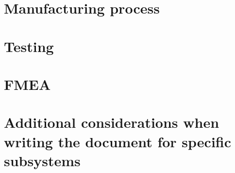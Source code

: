 \section{Manufacturing process}

\section{Testing}

\section{FMEA}

\section{Additional considerations when writing the document for specific subsystems}







\newpage






\newpage